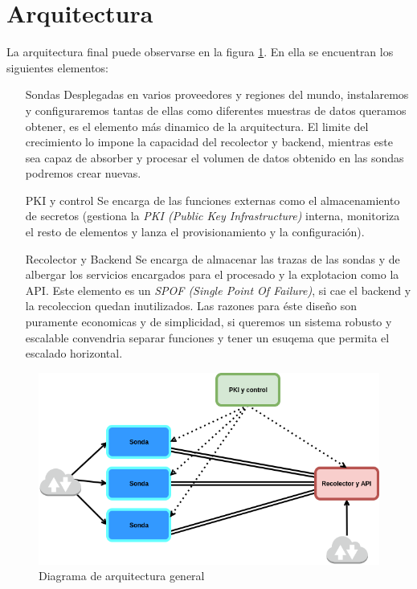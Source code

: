 \section{Arquitectura}

La arquitectura final puede observarse en la figura \ref{fig:arquitectura-general}. En ella se encuentran los siguientes elementos:

\begin{enumerate}
    \item[Sondas] Desplegadas en varios proveedores y regiones del mundo, instalaremos y configuraremos tantas de ellas como
    diferentes muestras de datos queramos obtener, es el elemento más dinamico de la arquitectura. El limite del crecimiento lo impone la capacidad
    del recolector y backend, mientras este sea capaz de absorber y procesar el volumen de datos obtenido en las sondas podremos crear nuevas.
    \item[PKI y control] Se encarga de las funciones externas como el almacenamiento de secretos (gestiona la \emph{PKI (Public Key Infrastructure)} interna, monitoriza el resto de elementos y lanza el provisionamiento y la configuración).
    \item[Recolector y Backend] Se encarga de almacenar las trazas de las sondas y de albergar los servicios encargados para el procesado y la explotacion como la API. Este elemento es un \emph{SPOF (Single Point Of Failure)}, si cae el backend y la recoleccion quedan inutilizados.
    Las razones para éste diseño son puramente economicas y de simplicidad, si queremos un sistema robusto y escalable convendria separar funciones y tener un esuqema que permita el escalado horizontal.
\end{enumerate}

\begin{figure}[h]
    \centering
      \includegraphics[scale=0.5]{images/arquitectura_general}
    \caption{Diagrama de arquitectura general}
    \label{fig:arquitectura-general}
  \end{figure}

